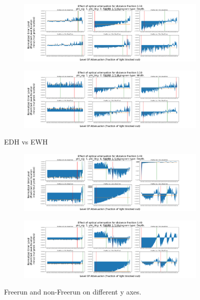 \documentclass{article}
\begin{document}
\begin{figure}[H]
\centering
\begin{subfigure}[b]{1\textwidth}
\includegraphics[width=1\linewidth]{depthExample.png}
\label{fig:Depth Example}
\end{subfigure}
\begin{subfigure}[b]{1\textwidth}
\includegraphics[width=1\linewidth]{widthExample.png}
\label{fig:Width Example}
\end{subfigure}
\caption{\label{fig:histogramComparison}EDH vs EWH}
\end{figure}

\begin{figure}[H]
\centering
\begin{subfigure}[b]{1\textwidth}
\includegraphics[width=1\linewidth]{zoomedFreeExample.png}
\label{fig:zoomedExample}
\end{subfigure}
\begin{subfigure}[b]{1\textwidth}
\includegraphics[width=1\linewidth]{sharedFreeExample.png}
\label{fig:sharedExample}
\end{subfigure}
\caption{\label{fig:freerunComparsion}Freerun and non-Freerun on different y axes.}
\end{figure}
\end{document}

